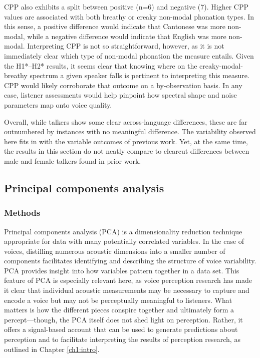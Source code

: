 CPP also exhibits a split between positive (n=6) and negative (7). Higher CPP values are associated with both breathy or creaky non-modal phonation types. In this sense, a positive difference would indicate that Cantonese was more non-modal, while a negative difference would indicate that English was more non-modal. Interpreting CPP is not so straightforward, however, as it is not immediately clear which type of non-modal phonation the measure entails. Given the H1*--H2* results, it seems clear that knowing where on the creaky-modal-breathy spectrum a given speaker falls is pertinent to interpreting this measure. CPP would likely corroborate that outcome on a by-observation basis. In any case, listener assessments would help pinpoint how spectral shape and noise parameters map onto voice quality.  

Overall, while talkers show some clear across-language differences, these are far outnumbered by instances with no meaningful difference. The variability observed here fits in with the variable outcomes of previous work. Yet, at the same time, the results in this section do not neatly compare to clearcut differences between male and female talkers found in prior work.

\subsection{Principal components analysis}\label{ch3:sec:pca}

\subsubsection{Methods}

Principal components analysis (PCA) is a dimensionality reduction technique appropriate for data with many potentially correlated variables. In the case of voices, distilling numerous acoustic dimensions into a smaller number of components facilitates identifying and describing the structure of voice variability. PCA provides insight into how variables pattern together in a data set. This feature of PCA is especially relevant here, as voice perception research has made it clear that individual acoustic measurements may be necessary to capture and encode a voice but may not be perceptually meaningful to listeners. What matters is how the different pieces conspire together and ultimately form a percept---though, the PCA itself does not shed light on perception. Rather, it offers a signal-based account that can be used to generate predictions about perception and to facilitate interpreting the results of perception research, as outlined in Chapter \ref{ch1:intro}.

